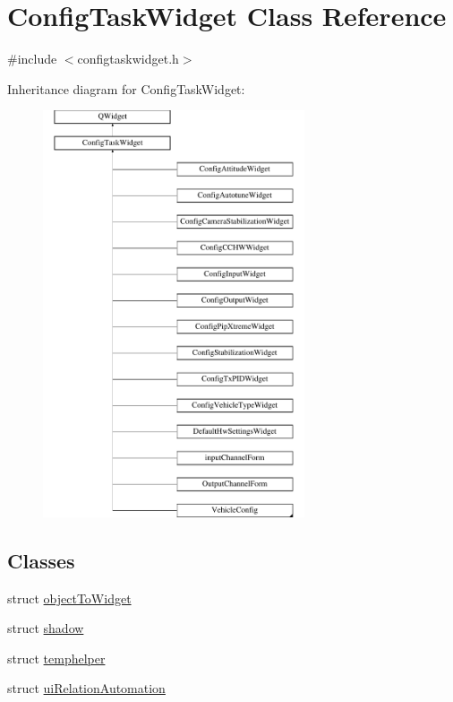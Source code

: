 \hypertarget{class_config_task_widget}{\section{Config\-Task\-Widget Class Reference}
\label{class_config_task_widget}
}


{\ttfamily \#include $<$configtaskwidget.\-h$>$}

Inheritance diagram for Config\-Task\-Widget\-:\begin{figure}[H]
\begin{center}
\leavevmode
\includegraphics[height=12.000000cm]{class_config_task_widget}
\end{center}
\end{figure}
\subsection*{Classes}
\begin{DoxyCompactItemize}
\item 
struct \hyperlink{struct_config_task_widget_1_1object_to_widget}{object\-To\-Widget}
\item 
struct \hyperlink{struct_config_task_widget_1_1shadow}{shadow}
\item 
struct \hyperlink{struct_config_task_widget_1_1temphelper}{temphelper}
\item 
struct \hyperlink{struct_config_task_widget_1_1ui_relation_automation}{ui\-Relation\-Automation}
\end{DoxyCompactItemize}
